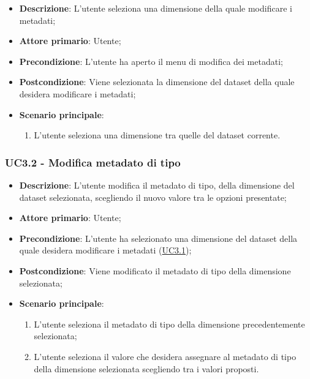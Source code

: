 \begin{itemize}
    \item \textbf{Descrizione}: L’utente seleziona una dimensione della quale modificare i metadati;
    \item \textbf{Attore primario}: Utente;

    \item \textbf{Precondizione}:   L'utente ha aperto il menu di modifica dei metadati;
    \item \textbf{Postcondizione}:  Viene selezionata la dimensione del dataset della quale desidera modificare i 
    metadati;

    \item \textbf{Scenario principale}:
    \begin{enumerate}
        \item L'utente seleziona una dimensione tra quelle del dataset corrente.
    \end{enumerate}
\end{itemize}

\subsubsection{UC3.2 - Modifica metadato di tipo}
\label{ssub:uc3.2}

\begin{itemize}
    \item \textbf{Descrizione}: L’utente modifica il metadato di tipo, della dimensione del dataset selezionata, 
    scegliendo il nuovo valore tra le opzioni presentate;
	
    \item \textbf{Attore primario}: Utente;
    
    \item \textbf{Precondizione}:   L'utente ha selezionato una dimensione del dataset della quale desidera modificare 
    i metadati (\hyperref[ssub:uc3.1]{UC3.1});
    \item \textbf{Postcondizione}:  Viene modificato il metadato di tipo della dimensione selezionata;

	\item \textbf{Scenario principale}:
	\begin{enumerate}
        \item L'utente seleziona il metadato di tipo della dimensione precedentemente selezionata;
        \item L'utente seleziona il valore che desidera assegnare al metadato di tipo della dimensione selezionata 
        scegliendo tra i valori proposti.
    \end{enumerate}
    
   
\end{itemize}



